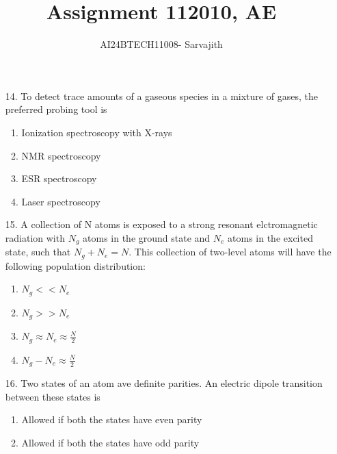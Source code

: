 \documentclass[journal]{IEEEtran}
\begin{document}

\vspace{3cm}


\author{AI24BTECH11008- Sarvajith
}
\title{Assignment 11}
{\let\newpage\relax\maketitle}
\title{2010, AE}
\renewcommand{\thefigure}{\theenumi}
\renewcommand{\thetable}{\theenumi}
\setlength{\intextsep}{10pt} %
\renewcommand{\thetable}{\theenumi}
\begin{enumerate}
    \item[14.] To detect trace amounts of a gaseous species in a mixture of gases, the preferred probing tool is
    \begin{enumerate}[label=(\Alph*)]
        \item Ionization spectroscopy with X-rays
        \item NMR spectroscopy
        \item ESR spectroscopy
        \item Laser spectroscopy
    \end{enumerate}
    \item[15.] A collection of N atoms is exposed to a strong resonant elctromagnetic radiation with $N_g$ atoms in the ground state and $N_e$ atoms in the excited state, such that $N_g+N_e = N$. This collection of two-level atoms will have the following population distribution:
    \begin{enumerate}[label=(\Alph*)]
        \item $N_g<<N_e$
        \item $N_g>>N_e$
        \item $N_g\approx N_e\approx \frac{N}{2}$
        \item $N_g-N_e\approx \frac{N}{2}$
    \end{enumerate}
    \item[16.] Two states of an atom ave definite parities. An electric dipole transition between these states is
    \begin{enumerate}[label=(\Alph*)]
        \item Allowed if both the states have even parity
        \item Allowed if both the states have odd parity

\end{enumerate}
\end{enumerate}
\end{document}
